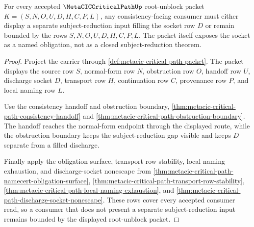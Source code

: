 \begin{theorem}
\label{thm:metacic-critical-path-discharge-socket-coverage}
For every accepted $\MetaCICCriticalPathUp$ root-unblock packet $K=(S,N,O,U,D,H,C,P,L)$, any consistency-facing consumer must either display a separate subject-reduction input filling the socket row $D$ or remain bounded by the rows $S,N,O,U,D,H,C,P,L$. The packet itself exposes the socket as a named obligation, not as a closed subject-reduction theorem.
\end{theorem}
\begin{proof}
Project the carrier through \autoref{def:metacic-critical-path-packet}. The packet displays the source row $S$, normal-form row $N$, obstruction row $O$, handoff row $U$, discharge socket $D$, transport row $H$, continuation row $C$, provenance row $P$, and local naming row $L$.

Use the consistency handoff and obstruction boundary, \autoref{thm:metacic-critical-path-consistency-handoff} and \autoref{thm:metacic-critical-path-obstruction-boundary}. The handoff reaches the normal-form endpoint through the displayed route, while the obstruction boundary keeps the subject-reduction gap visible and keeps $D$ separate from a filled discharge.

Finally apply the obligation surface, transport row stability, local naming exhaustion, and discharge-socket nonescape from \autoref{thm:metacic-critical-path-namecert-obligation-surface}, \autoref{thm:metacic-critical-path-transport-row-stability}, \autoref{thm:metacic-critical-path-local-naming-exhaustion}, and \autoref{thm:metacic-critical-path-discharge-socket-nonescape}. These rows cover every accepted consumer read, so a consumer that does not present a separate subject-reduction input remains bounded by the displayed root-unblock packet.
\end{proof}



